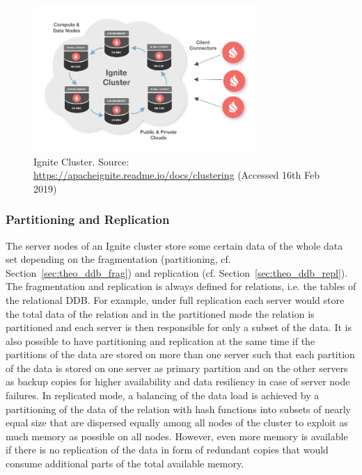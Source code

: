 \begin{figure}[h]
    \centering
    \includegraphics[width=0.75\textwidth,keepaspectratio=true]{img/9287d3c-ignite-deploy.png}
    \caption{Ignite Cluster. Source: \protect\url{https://apacheignite.readme.io/docs/clustering} (Accessed 16th Feb 2019)}
    \label{fig:ign_cluster}
\end{figure}


\subsubsection{Partitioning and Replication}
\label{sec:meth_ign_panre}
The server nodes of an Ignite cluster store some certain data of the whole data set depending on the fragmentation (partitioning, cf.
Section~\ref{sec:theo_ddb_frag}) and replication (cf. Section~\ref{sec:theo_ddb_repl}). The fragmentation and replication is always defined for relations,
i.e. the tables of the relational DDB. For example, under full replication each server would store the total data of the relation and in the partitioned 
mode the relation is partitioned and each server is then responsible for only a subset of the data. It is also possible to have partitioning and 
replication at the same time if the partitions of the data are stored on more than one server such that each partition of the data is stored on one 
server as primary partition and on the other servers as backup copies for higher availability and data resiliency in case of server node failures. 
In replicated mode, a balancing of the data load is achieved by a partitioning of the data of the relation with hash functions into subsets of nearly 
equal size that are dispersed equally among all nodes of the cluster to exploit as much memory as possible on all nodes. However, even more memory is
available if there is no replication of the data in form of redundant copies that would consume additional parts of the total available memory. 

